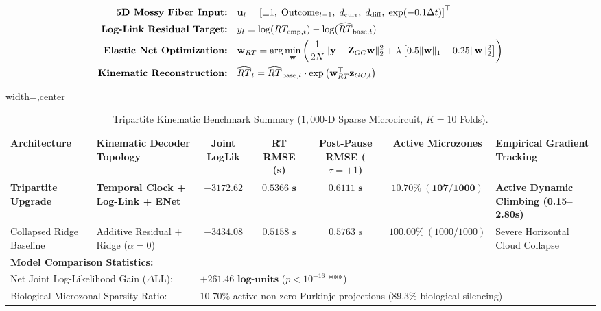 \documentclass[11pt,twoside,a4paper]{article}
\begin{document}
\begin{align}
\text{\textbf{5D Mossy Fiber Input:}} \quad &\mathbf{u}_t = \left[ \pm 1, \; \text{Outcome}_{t-1}, \; d_{\text{curr}}, \; d_{\text{diff}}, \; \exp(-0.1 \Delta t) \right]^\top \\
\text{\textbf{Log-Link Residual Target:}} \quad &y_t = \log(RT_{\text{emp}, t}) - \log(\widehat{RT}_{\text{base}, t}) \\
\text{\textbf{Elastic Net Optimization:}} \quad &\mathbf{w}_{RT} = \arg\min_{\mathbf{w}} \left( \frac{1}{2N} \Vert \mathbf{y} - \mathbf{Z}_{GC} \mathbf{w} \Vert_2^2 + \lambda \left[ 0.5 \Vert\mathbf{w}\Vert_1 + 0.25 \Vert\mathbf{w}\Vert_2^2 \right] \right) \\
\text{\textbf{Kinematic Reconstruction:}} \quad &\widehat{RT}_t = \widehat{RT}_{\text{base}, t} \cdot \exp\left( \mathbf{w}_{RT}^\top \mathbf{z}_{GC, t} \right)
\end{align}

\begin{table}[H]
\centering
\caption{Tripartite Kinematic Benchmark Summary ($1,000$-D Sparse Microcircuit, $K=10$ Folds).}
\label{tab:tripartite_summary}
\vspace{0.4em}
\begin{adjustbox}{width=\textwidth,center}
\begin{tabular}{l l c c c c l}
\toprule
\textbf{Architecture} & \textbf{Kinematic Decoder Topology} & \textbf{Joint LogLik} & \textbf{RT RMSE (s)} & \textbf{Post-Pause RMSE ($\tau=+1$)} & \textbf{Active Microzones} & \textbf{Empirical Gradient Tracking} \\
\midrule
\textbf{Tripartite Upgrade} & \textbf{Temporal Clock + Log-Link + ENet} & $\mathbf{-3172.62}$ & $\mathbf{0.5366\text{ s}}$ & $\mathbf{0.6111\text{ s}}$ & $\mathbf{10.70\% \ (107 / 1000)}$ & \textbf{Active Dynamic Climbing (0.15--2.80s)} \\
Collapsed Ridge Baseline & Additive Residual + Ridge ($\alpha=0$) & $-3434.08$ & $0.5158\text{ s}$ & $0.5763\text{ s}$ & $100.00\% \ (1000 / 1000)$ & Severe Horizontal Cloud Collapse \\
\midrule
\multicolumn{7}{l}{\textbf{Model Comparison Statistics:}} \\
\multicolumn{2}{l}{Net Joint Log-Likelihood Gain ($\Delta \text{LL}$):} & \multicolumn{5}{l}{$\mathbf{+261.46\text{ log-units}}$ ($p < 10^{-16}$ ***)} \\
\multicolumn{2}{l}{Biological Microzonal Sparsity Ratio:} & \multicolumn{5}{l}{$\mathbf{10.70\%}$ active non-zero Purkinje projections ($89.3\%$ biological silencing)} \\
\bottomrule
\end{tabular}
\end{adjustbox}
\end{table}
\end{document}
